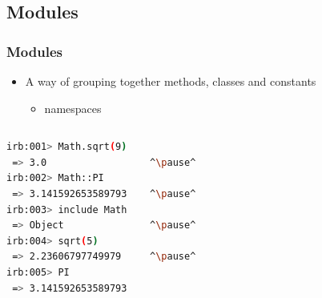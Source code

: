 \subsection{Modules}
\begin{frame}[fragile]\frametitle{Modules}

\begin{itemize}

\item A way of grouping together methods, classes and constants

\begin{itemize}
\item namespaces
\end{itemize}

\end{itemize}

\pause

\begin{columns}[c]

\begin{column}{5.3cm}
\begin{lstlisting}[language=bash, escapechar={^}]
irb:001> Math.sqrt(9)
 => 3.0                  ^\pause^
irb:002> Math::PI
 => 3.141592653589793    ^\pause^
irb:003> include Math
 => Object               ^\pause^
irb:004> sqrt(5)
 => 2.23606797749979     ^\pause^
irb:005> PI
 => 3.141592653589793 
\end{lstlisting}
\end{column}

\pause

\begin{column}{5.3cm}

\end{column}

\end{columns}

\end{frame}





